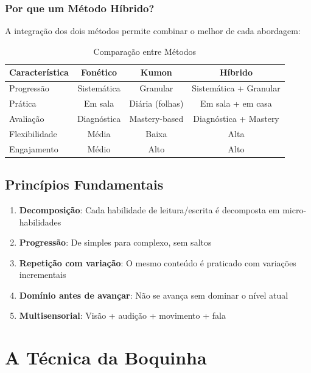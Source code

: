 \subsection{Por que um Método Híbrido?}

A integração dos dois métodos permite combinar o melhor de cada abordagem:

\begin{table}[h]
\centering
\caption{Comparação entre Métodos}
\begin{tabular}{|l|c|c|c|}
\hline
\textbf{Característica} & \textbf{Fonético} & \textbf{Kumon} & \textbf{Híbrido} \\
\hline
Progressão & Sistemática & Granular & Sistemática + Granular \\
Prática & Em sala & Diária (folhas) & Em sala + em casa \\
Avaliação & Diagnóstica & Mastery-based & Diagnóstica + Mastery \\
Flexibilidade & Média & Baixa & Alta \\
Engajamento & Médio & Alto & Alto \\
\hline
\end{tabular}
\end{table}

\section{Princípios Fundamentais}

\begin{enumerate}[leftmargin=2cm]
  \item \textbf{Decomposição}: Cada habilidade de leitura/escrita é decomposta em micro-habilidades
  \item \textbf{Progressão}: De simples para complexo, sem saltos
  \item \textbf{Repetição com variação}: O mesmo conteúdo é praticado com variações incrementais
  \item \textbf{Domínio antes de avançar}: Não se avança sem dominar o nível atual
  \item \textbf{Multisensorial}: Visão + audição + movimento + fala
\end{enumerate}


\chapter{A Técnica da Boquinha}

